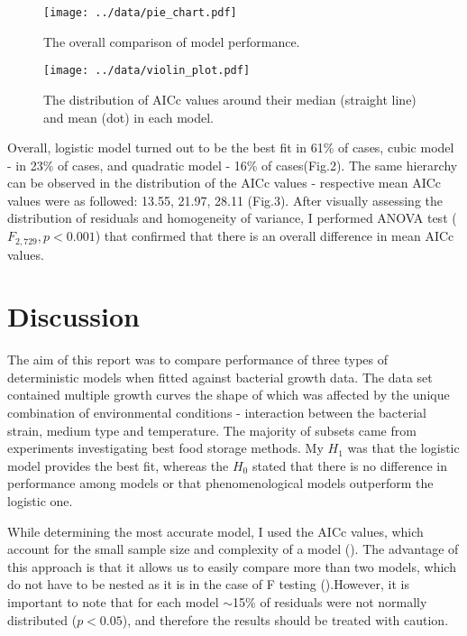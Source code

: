 \documentclass[a4paper,11pt]{article}
\begin{document}
\begin{figure}[!ht]
\centering
\begin{minipage}{.5\textwidth}
    \centering
    \texttt{[image: ../data/pie\_chart.pdf]}
    \caption{The overall comparison of model performance.}
    \label{fig.test1}
\end{minipage}%
\begin{minipage}{.5\textwidth}
    \centering
    \texttt{[image: ../data/violin\_plot.pdf]}
    \caption{The distribution of AICc values around their median (straight line) and mean (dot) in each model.}
    \label{fig:test2}
\end{minipage}
\end{figure}

Overall, logistic model turned out to be the best fit in 61\% of cases, cubic model - in 23\% of cases, and quadratic model - 16\% of cases(Fig.2). The same hierarchy can be observed in the distribution of the AICc values - respective mean AICc values were as followed: 13.55, 21.97, 28.11 (Fig.3). After visually assessing the distribution of residuals and homogeneity of variance, I performed ANOVA test ($F_{2,729}, p < 0.001$) that confirmed that there is an overall difference in mean AICc values.

\section{Discussion}
    
The aim of this report was to compare performance of three types of deterministic models when fitted against bacterial growth data. The data set contained multiple growth curves the shape of which was affected by the unique combination of environmental conditions - interaction between the bacterial strain, medium type and temperature. The majority of subsets came from experiments investigating best food storage methods. My $H_{1}$ was that the logistic model provides the best fit, whereas the $H_{0}$ stated that there is no difference in performance among models or that phenomenological models outperform the logistic one. \par 

While determining the most accurate model, I used the AICc values, which account for the small sample size  and complexity of a model (\cite{johnson2004model}). The advantage of this approach is that it allows us to easily compare more than two models, which do not have to be nested as it is in the case of F testing (\cite{motulsky2004fitting}).However, it is important to note that for each model $\sim$15\% of residuals were not normally distributed ($p < 0.05$), and therefore the results should be treated with caution.\par
\end{document}
